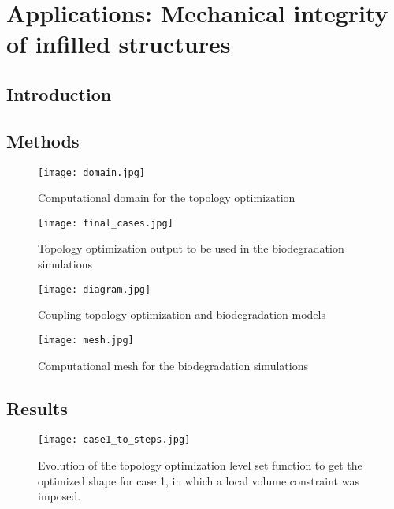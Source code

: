 \chapter{Applications: Mechanical integrity of infilled structures}\label{ch:infill}

\section{Introduction}

\section{Methods}

\begin{figure}[h]
\centering
\medskip
\texttt{[image: domain.jpg]}
\caption[Computational domain for the topology optimization]{Computational domain for the topology optimization} \label{fig:infill_domain}
\end{figure}


\begin{figure}[h]
\centering
\medskip
\texttt{[image: final\_cases.jpg]}
\caption[Topology optimization output to be used in the biodegradation simulations]{Topology optimization output to be used in the biodegradation simulations} \label{fig:infill_final_cases}
\end{figure}


\begin{figure}[h]
\centering
\medskip
\texttt{[image: diagram.jpg]}
\caption[Coupling topology optimization and biodegradation models]{Coupling topology optimization and biodegradation models} \label{fig:infill_diagram}
\end{figure}


\begin{figure}[h]
\centering
\medskip
\texttt{[image: mesh.jpg]}
\caption[Computational mesh for the biodegradation simulations]{Computational mesh for the biodegradation simulations} \label{fig:infill_mesh}
\end{figure}



\section{Results}


\begin{figure}[h]
\centering
\medskip
\texttt{[image: case1\_to\_steps.jpg]}
\caption[Evolution of the topology optimization level set function for case 1]{Evolution of the topology optimization level set function to get the optimized shape for case 1, in which a local volume constraint was imposed.} \label{fig:infill_case1_to_steps}
\end{figure}

